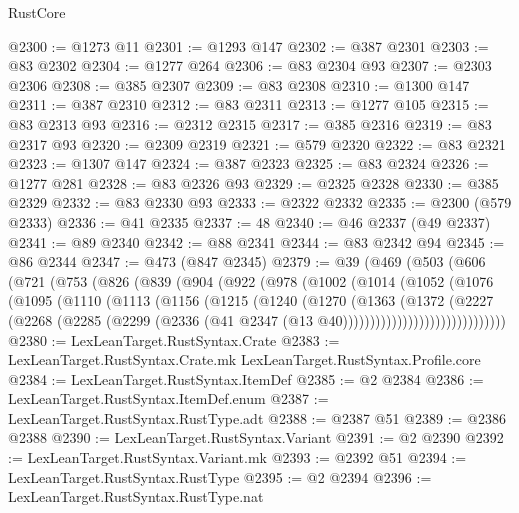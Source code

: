 \begin{lexlean}{RustCore}
\begin{coremodule}
@2300 := @1273 @11
@2301 := @1293 @147
@2302 := @387 @2301
@2303 := @83 @2302
@2304 := @1277 @264
@2306 := @83 @2304 @93
@2307 := @2303 @2306
@2308 := @385 @2307
@2309 := @83 @2308
@2310 := @1300 @147
@2311 := @387 @2310
@2312 := @83 @2311
@2313 := @1277 @105
@2315 := @83 @2313 @93
@2316 := @2312 @2315
@2317 := @385 @2316
@2319 := @83 @2317 @93
@2320 := @2309 @2319
@2321 := @579 @2320
@2322 := @83 @2321
@2323 := @1307 @147
@2324 := @387 @2323
@2325 := @83 @2324
@2326 := @1277 @281
@2328 := @83 @2326 @93
@2329 := @2325 @2328
@2330 := @385 @2329
@2332 := @83 @2330 @93
@2333 := @2322 @2332
@2335 := @2300 (@579 @2333)
@2336 := @41 @2335
@2337 := 48
@2340 := @46 @2337 (@49 @2337)
@2341 := @89 @2340
@2342 := @88 @2341
@2344 := @83 @2342 @94
@2345 := @86 @2344
@2347 := @473 (@847 @2345)
@2379 := @39
    (@469
      (@503
        (@606
          (@721
            (@753
              (@826
                (@839
                  (@904
                    (@922
                      (@978
                        (@1002
                          (@1014
                            (@1052
                              (@1076
                                (@1095
                                  (@1110
                                    (@1113
                                      (@1156
                                        (@1215
                                          (@1240
                                            (@1270
                                              (@1363
                                                (@1372
                                                  (@2227
                                                    (@2268
                                                      (@2285
                                                        (@2299
                                                          (@2336
                                                            (@41
                                                              @2347
                                                              (@13 @40))))))))))))))))))))))))))))))
@2380 := LexLeanTarget.RustSyntax.Crate
@2383 := LexLeanTarget.RustSyntax.Crate.mk LexLeanTarget.RustSyntax.Profile.core
@2384 := LexLeanTarget.RustSyntax.ItemDef
@2385 := @2 @2384
@2386 := LexLeanTarget.RustSyntax.ItemDef.enum
@2387 := LexLeanTarget.RustSyntax.RustType.adt
@2388 := @2387 @51
@2389 := @2386 @2388
@2390 := LexLeanTarget.RustSyntax.Variant
@2391 := @2 @2390
@2392 := LexLeanTarget.RustSyntax.Variant.mk
@2393 := @2392 @51
@2394 := LexLeanTarget.RustSyntax.RustType
@2395 := @2 @2394
@2396 := LexLeanTarget.RustSyntax.RustType.nat

\end{coremodule}
\end{lexlean}
